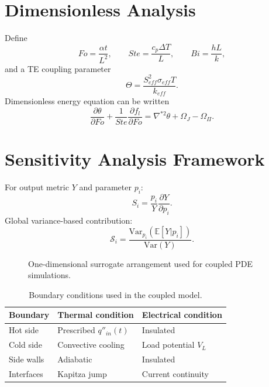 \section{Dimensionless Analysis}
Define
\begin{equation}\label{eq:fourier}
Fo=\frac{\alpha t}{L^2},\qquad Ste=\frac{c_p\Delta T}{L},\qquad Bi=\frac{hL}{k},
\end{equation}
and a TE coupling parameter
\begin{equation}\label{eq:te_coupling}
\Theta=\frac{S_{eff}^2\sigma_{eff}T}{k_{eff}}.
\end{equation}
Dimensionless energy equation can be written
\begin{equation}\label{eq:dimless_energy}
\frac{\partial \theta}{\partial Fo}+\frac{1}{Ste}\frac{\partial f_l}{\partial Fo}=\nabla^{*2}\theta+\Omega_J-\Omega_\Pi.
\end{equation}

\section{Sensitivity Analysis Framework}
For output metric $Y$ and parameter $p_i$:
\begin{equation}\label{eq:sensitivity}
S_i=\frac{p_i}{Y}\frac{\partial Y}{\partial p_i}.
\end{equation}
Global variance-based contribution:
\begin{equation}\label{eq:sobol}
\mathcal{S}_i=\frac{\mathrm{Var}_{p_i}\left(\mathbb{E}[Y|p_i]\right)}{\mathrm{Var}(Y)}.
\end{equation}

\begin{figure}[htbp]
\centering
{}
\caption{One-dimensional surrogate arrangement used for coupled PDE simulations.}
\label{fig:multi_domain}
\end{figure}

\begin{table}[htbp]
\centering
\caption{Boundary conditions used in the coupled model.}
\label{tab:multi_bc}
\begin{tabular}{lll}
\toprule
Boundary & Thermal condition & Electrical condition \\
\midrule
Hot side & Prescribed $q''_{in}(t)$ & Insulated \\
Cold side & Convective cooling & Load potential $V_L$ \\
Side walls & Adiabatic & Insulated \\
Interfaces & Kapitza jump & Current continuity \\
\bottomrule
\end{tabular}
\end{table}
